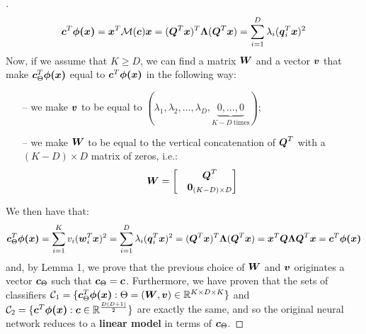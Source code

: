 \begin{questions}
\begin{proof}[\unskip\nopunct]
        \[
            \vb*{c}^T \vb*{\phi(x)} =  \vb*{x}^T \mathcal{M}(\vb*{c}) \vb*{x} = (\vb*{Q}^T \vb*{x})^T \vb*{\Lambda} (\vb*{Q}^T \vb*{x}) = \sum_{i = 1}^{D} \lambda_i (\vb*{q}_i^T\vb*{x})^2
        \]
        Now, if we assume that $K \ge D$, we can find a matrix $\vb*{W}$ and a vector $\vb*{v}$ that make $\vb*{c}^T_{\Theta} \vb*{\phi(x)}$ equal to $\vb*{c}^T \vb*{\phi(x)}$ in the following way:
        \begin{itemize}
            \item[--] we make $\vb*{v}$ to be equal to $(\lambda_1, \lambda_2, \dots, \lambda_D, \underbrace{0, \dots, 0}_{K - D \: \text{times}})$;
            \item[--] we make $\vb*{W}$ to be equal to the vertical concatenation of $\vb*{Q}^T$ with a $(K - D) \times D$ matrix of zeros, i.e.:
            \begin{align*}
            \vb*{W} = 
                \begin{bmatrix}
                    &\vb*{Q}^T \\
                    &\vb*{0}_{(K - D) \times D}
                \end{bmatrix}
            \end{align*}
        \end{itemize}
        We then have that:
        \[
            \vb*{c}^T_{\Theta} \vb*{\phi(x)} = \sum_{i = 1}^{K} v_i (\vb*{w}_i^T\vb*{x})^2 =  \sum_{i = 1}^{D} \lambda_i (\vb*{q}_i^T\vb*{x})^2 = (\vb*{Q}^T \vb*{x})^T \vb*{\Lambda} (\vb*{Q}^T \vb*{x}) = \vb*{x}^T \vb*{Q} \vb*{\Lambda}\vb*{Q}^T \vb*{x} = \vb*{c}^T \vb*{\phi(x)}
        \]
        and, by Lemma 1, we prove that the previous choice of $\vb*{W}$ and $\vb*{v}$ originates a vector $\vb*{c}_{\Theta}$ such that $\vb*{c}_{\Theta} = \vb*{c}$. Furthermore, we have proven that the sets of classifiers $\mathcal{C}_1 = \{\vb*{c}_{\Theta}^T\vb*{\phi(x)} : \Theta = (\vb*{W}, \vb*{v}) \in \mathbb{R}^{K \times D \times K}\}$ and $\mathcal{C}_2 = \{\vb*{c}^T\vb*{\phi(x)} : \vb*{c} \in \mathbb{R}^{\frac{D(D + 1)}{2}}\}$ are exactly the same, and so the original neural network reduces to a \textbf{linear model} in terms of $\vb*{c}_{\Theta}$.
        \end{proof}
 

\end{questions}
